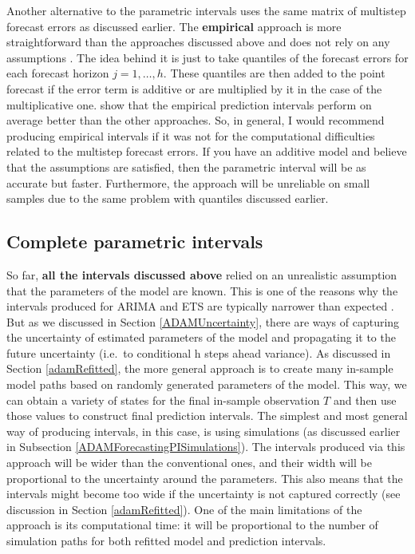 \documentclass[
]{book}
\theoremstyle{definition}
\theoremstyle{definition}
\theoremstyle{definition}
\theoremstyle{definition}
\theoremstyle{remark}
\begin{document}
Another alternative to the parametric intervals uses the same matrix of multistep forecast errors as discussed earlier. The \textbf{empirical} approach is more straightforward than the approaches discussed above and does not rely on any assumptions \citep[it was discussed in][]{Lee2014}. The idea behind it is just to take quantiles of the forecast errors for each forecast horizon \(j=1,\dots,h\). These quantiles are then added to the point forecast if the error term is additive or are multiplied by it in the case of the multiplicative one. \citet{Kourentzes2021TBA} show that the empirical prediction intervals perform on average better than the other approaches. So, in general, I would recommend producing empirical intervals if it was not for the computational difficulties related to the multistep forecast errors. If you have an additive model and believe that the assumptions are satisfied, then the parametric interval will be as accurate but faster. Furthermore, the approach will be unreliable on small samples due to the same problem with quantiles discussed earlier.

\hypertarget{complete-parametric-intervals}{%
\subsection{Complete parametric intervals}\label{complete-parametric-intervals}}

So far, \textbf{all the intervals discussed above} relied on an unrealistic assumption that the parameters of the model are known. This is one of the reasons why the intervals produced for ARIMA and ETS are typically narrower than expected \citep[see, for example, results of tourism competition,][]{Athanasopoulos2011}. But as we discussed in Section \ref{ADAMUncertainty}, there are ways of capturing the uncertainty of estimated parameters of the model and propagating it to the future uncertainty (i.e.~to conditional h steps ahead variance). As discussed in Section \ref{adamRefitted}, the more general approach is to create many in-sample model paths based on randomly generated parameters of the model. This way, we can obtain a variety of states for the final in-sample observation \(T\) and then use those values to construct final prediction intervals. The simplest and most general way of producing intervals, in this case, is using simulations (as discussed earlier in Subsection \ref{ADAMForecastingPISimulations}). The intervals produced via this approach will be wider than the conventional ones, and their width will be proportional to the uncertainty around the parameters. This also means that the intervals might become too wide if the uncertainty is not captured correctly (see discussion in Section \ref{adamRefitted}). One of the main limitations of the approach is its computational time: it will be proportional to the number of simulation paths for both refitted model and prediction intervals.
\end{document}
